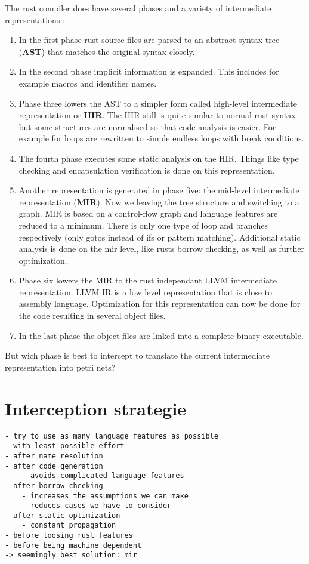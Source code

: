 The rust compiler does have several phases and a variety of intermediate representations \cite[Chapter 2.1]{rustc-guide}:
\begin{enumerate}
    \item In the first phase rust source files are parsed to an abstract syntax tree (\textbf{AST}) that matches the original syntax closely.
    \item In the second phase implicit information is expanded. This includes for example macros and identifier names.
    \item Phase three lowers the AST to a simpler form called high-level intermediate representation or \textbf{HIR}.
    The HIR still is quite similar to normal rust syntax but some structures are normalised so that code analysis is easier. 
    For example for loops are rewritten to simple endless loops with break conditions.
    \item The fourth phase executes some static analysis on the HIR.
    Things like type checking and encapsulation verification is done on this representation.
    \item Another representation is generated in phase five: the mid-level intermediate representation (\textbf{MIR}).
    Now we leaving the tree structure and switching to a graph.
    MIR is based on a control-flow graph \cite{} and language features are reduced to a minimum.
    There is only one type of loop and branches respectively (only gotos instead of ifs or pattern matching).
    Additional static analysis is done on the mir level,
    like rusts borrow checking, as well as further optimization.
    \item Phase six lowers the MIR to the rust independant LLVM\cite{} intermediate representation.
    LLVM IR is a low level representation that is close to assembly language.
    Optimization for this representation can now be done for the code resulting in several object files.
    \item In the last phase the object files are linked into a complete binary executable.
\end{enumerate}
But wich phase is best to intercept to translate the current intermediate representation into petri nets?

\section{Interception strategie}
\label{app_intercept}
\begin{verbatim}
- try to use as many language features as possible
- with least possible effort
- after name resolution
- after code generation
    - avoids complicated language features
- after borrow checking
    - increases the assumptions we can make
    - reduces cases we have to consider
- after static optimization
    - constant propagation
- before loosing rust features
- before being machine dependent
-> seemingly best solution: mir
\end{verbatim}

